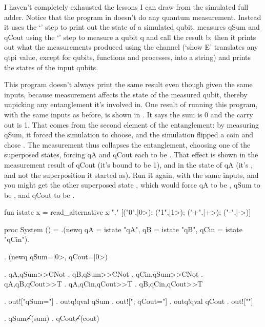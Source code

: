 I haven't completely exhausted the lessons I can draw from the simulated full adder. Notice that the program in  doesn't do any quantum measurement. Instead it uses the `' step to print out the state of a simulated qubit.  measures qSum and qCout using the `' step to measure a qubit q and call the result b; then it prints out what the measurements produced using the  channel (`show E' translates any qtpi value, except for qubits, functions and processes, into a string) and prints the states of the input qubits. 

This program doesn't always print the same result even though given the same inputs, because measurement affects the state of the measured qubit, thereby unpicking any entanglement it's involved in. One result of running this program, with the same inputs as before, is shown in . It says the sum is 0 and the carry out is 1. That comes from the second element of the entanglement: by measuring qSum, it forced the simulation to choose, and the simulation flipped a coin and chose \onezeroone{}. The measurement thus collapses the entanglement, choosing one of the superposed states, forcing qA and qCout each to be \one{}. That effect is shown in the measurement result of qCout (it's bound to be 1), and in the state of qA (it's \one{}, and not the superposition it started as). Run it again, with the same inputs, and you might get the other superposed state \zeroonezero{}, which would force qA to be \zero{}, qSum to be \one{}, and qCout to be \zero{}.
 
\mvb{\Cogginswithinputandmeasurement}
fun istate x = 
  read_alternative x "," [("0",|0>); ("1",|1>); ("+",|+>); ("-",|->)]

proc System () =
  .(newq qA   = istate "qA", 
         qB   = istate "qB",
         qCin = istate "qCin").
  
  . (newq qSum=|0>, qCout=|0>) 
  
  . qA,qSum>>CNot  . qB,qSum>>CNot    . qCin,qSum>>CNot 
  . qA,qB,qCout>>T . qA,qCin,qCout>>T . qB,qCin,qCout>>T 
  
  . out!["qSum="] . outq!qval qSum . out!["; qCout="] . outq!qval qCout .  out!["\n"] 
  
  . qSum⌢̸(sum) . qCout⌢̸(cout)
  
